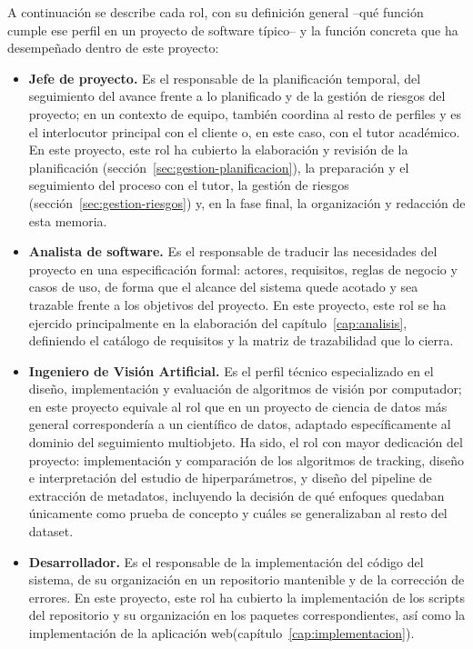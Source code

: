 A continuación se describe cada rol, con su definición general --qué
función cumple ese perfil en un proyecto de software típico-- y la función
concreta que ha desempeñado dentro de este proyecto:

\begin{itemize}
  \item \textbf{Jefe de proyecto.} Es el responsable de la planificación
        temporal, del seguimiento del avance frente a lo planificado y de
        la gestión de riesgos del proyecto; en un contexto de equipo,
        también coordina al resto de perfiles y es el interlocutor
        principal con el cliente o, en este caso, con el tutor académico.
        En este proyecto, este rol ha cubierto la elaboración y revisión de
        la planificación (sección~\ref{sec:gestion-planificacion}), la
        preparación y el seguimiento del proceso con el tutor, la
        gestión de riesgos (sección~\ref{sec:gestion-riesgos}) y, en la
        fase final, la organización y redacción de esta memoria.
  \item \textbf{Analista de software.} Es el responsable de traducir las
        necesidades del proyecto en una especificación formal: actores,
        requisitos, reglas de negocio y casos de uso, de forma que el
        alcance del sistema quede acotado y sea trazable frente a los
        objetivos del proyecto. En este proyecto, este rol se ha ejercido
        principalmente en la elaboración del capítulo~\ref{cap:analisis},
        definiendo el catálogo de requisitos y la matriz de trazabilidad
        que lo cierra.
  \item \textbf{Ingeniero de Visión Artificial.} Es el perfil técnico
        especializado en el diseño, implementación y evaluación de
        algoritmos de visión por computador; en este proyecto equivale al
        rol que en un proyecto de ciencia de datos más general
        correspondería a un científico de datos, adaptado específicamente
        al dominio del seguimiento multiobjeto. Ha sido, el
        rol con mayor dedicación del proyecto: implementación y comparación
        de los algoritmos de tracking, diseño e interpretación del estudio
        de hiperparámetros, y diseño del pipeline de extracción de
        metadatos, incluyendo la decisión de qué enfoques quedaban
        únicamente como prueba de concepto y cuáles se generalizaban al
        resto del dataset.
  \item \textbf{Desarrollador.} Es el responsable de la implementación del
        código del sistema, de su organización en un repositorio
        mantenible y de la corrección de errores.
        En este proyecto, este rol ha cubierto la implementación de los
        scripts del repositorio y su organización en los paquetes
        correspondientes, así como la implementación de la aplicación
        web(capítulo~\ref{cap:implementacion}).
\end{itemize}

